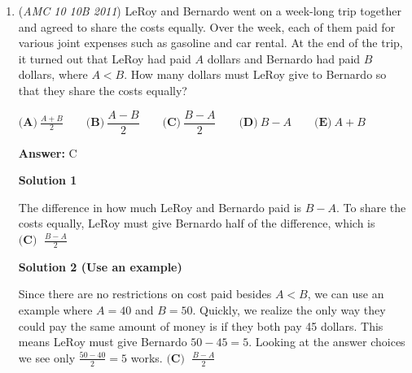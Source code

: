 \begin{enumerate}
 $\textbf{(A)}\ 3.75 \qquad\textbf{(B)}\ 4.5 \qquad\textbf{(C)}\ 5 \qquad\textbf{(D)}\ 6 \qquad\textbf{(E)}\ 8.75$

 \textbf{Answer: }A



\textbf{Solution 1}

The minimum dimensions of the rectangle are $1.5$ inches by $2.5$ inches. The minimum area is $1.5\times2.5=\boxed{\mathrm{(A) \ } 3.75}$ square inches.

 



\textbf{Solution 2 (Utilize algebra)}

Notice that the minimum area of a rectangle with dimensions $x$ inches by $y$ inches will result in $(x - 0.5)\times(y - 0.5)$. Simplify to get $xy - 0.5x - 0.5y + 0.25$. Plug in $2$ and $3$ for $x$ and $y$ to get $6 - 1 - 1.5 + 0.25 = \boxed{\text{(A)\ 3.75}}$ square inches.

 


	\item (\textit{AMC 10 10B 2011}) LeRoy and Bernardo went on a week-long trip together and agreed to share the costs equally. Over the week, each of them paid for various joint expenses such as gasoline and car rental. At the end of the trip, it turned out that LeRoy had paid $A$ dollars and Bernardo had paid $B$ dollars, where $A < B$. How many dollars must LeRoy give to Bernardo so that they share the costs equally?


 $\textbf{(A)}\ \frac{A + B}{2} \qquad\textbf{(B)}\ \dfrac{A - B}{2}\qquad\textbf{(C)}\ \dfrac{B - A}{2}\qquad\textbf{(D)}\ B - A \qquad\textbf{(E)}\ A + B$

 \textbf{Answer: }C



\textbf{Solution 1}

The difference in how much LeRoy and Bernardo paid is $B-A$. To share the costs equally, LeRoy must give Bernardo half of the difference, which is $\boxed{\textbf{(C) } \;\frac{B-A}{2}}$




\textbf{Solution 2 (Use an example)}

Since there are no restrictions on cost paid besides $A<B$, we can use an example where $A = 40$ and $B = 50$. Quickly, we realize the only way they could pay the same amount of money is if they both pay 45 dollars. This means LeRoy must give Bernardo $50 - 45 = 5$. Looking at the answer choices we see only $\frac{50-40}{2} = 5$ works. $\boxed{\textbf{(C) } \;\frac{B-A}{2}}$




\end{enumerate}
